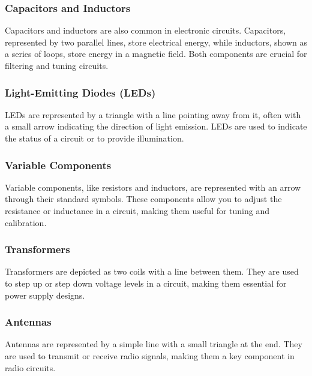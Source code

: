 \subsubsection*{Capacitors and Inductors}
Capacitors and inductors are also common in electronic circuits. Capacitors, represented by two parallel lines, store electrical energy, while inductors, shown as a series of loops, store energy in a magnetic field. Both components are crucial for filtering and tuning circuits.

\subsubsection*{Light-Emitting Diodes (LEDs)}
LEDs are represented by a triangle with a line pointing away from it, often with a small arrow indicating the direction of light emission. LEDs are used to indicate the status of a circuit or to provide illumination.

\subsubsection*{Variable Components}
Variable components, like resistors and inductors, are represented with an arrow through their standard symbols. These components allow you to adjust the resistance or inductance in a circuit, making them useful for tuning and calibration.

\subsubsection*{Transformers}
Transformers are depicted as two coils with a line between them. They are used to step up or step down voltage levels in a circuit, making them essential for power supply designs.

\subsubsection*{Antennas}
Antennas are represented by a simple line with a small triangle at the end. They are used to transmit or receive radio signals, making them a key component in radio circuits.



